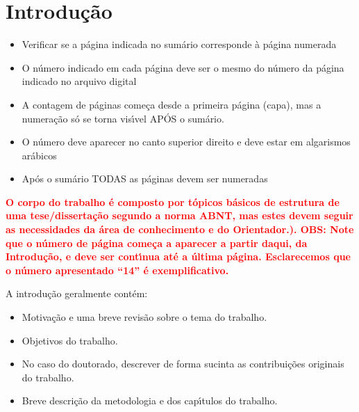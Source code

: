 \linenumbers
\chapter{Introdu\c{c}\~{a}o}
\label{cap:intro}

\begin{itemize}
    \item Verificar se a p\'{a}gina indicada no sum\'{a}rio corresponde \`{a} p\'{a}gina numerada
    \item O n\'{u}mero indicado em cada p\'{a}gina deve ser o mesmo do n\'{u}mero da p\'{a}gina indicado no arquivo digital
    \item A contagem de p\'{a}ginas come\c{c}a desde a primeira p\'{a}gina (capa), mas a numera\c{c}\~{a}o s\'{o} se torna vis\'{\i}vel AP\'{O}S o sum\'{a}rio.
    \item O n\'{u}mero deve aparecer no canto superior direito e deve estar em algarismos ar\'{a}bicos
    \item Ap\'{o}s o sum\'{a}rio TODAS as p\'{a}ginas devem ser numeradas
\end{itemize}


\textbf{\textcolor{red}{O corpo do trabalho \'{e} composto por t\'{o}picos b\'{a}sicos de estrutura de uma tese/disserta\c{c}\~{a}o segundo a norma ABNT, mas estes devem seguir as necessidades da \'{a}rea de conhecimento e do Orientador.).  OBS: Note que o n\'{u}mero de p\'{a}gina come\c{c}a a aparecer a partir daqui, da Introdu\c{c}\~{a}o, e deve ser cont\'{\i}nua at\'{e} a \'{u}ltima p\'{a}gina. Esclarecemos que o n\'{u}mero apresentado “14” \'{e} exemplificativo.   }}

A introdu\c{c}\~{a}o geralmente contém:

\begin{itemize}
    \item Motiva\c{c}\~{a}o e uma breve revis\~{a}o sobre o tema do trabalho.
    \item Objetivos do trabalho.
    \item No caso do doutorado, descrever de forma sucinta as contribui\c{c}\~{o}es originais do trabalho.
    \item Breve descri\c{c}\~{a}o da metodologia e dos cap\'{\i}tulos do trabalho.
\end{itemize}

